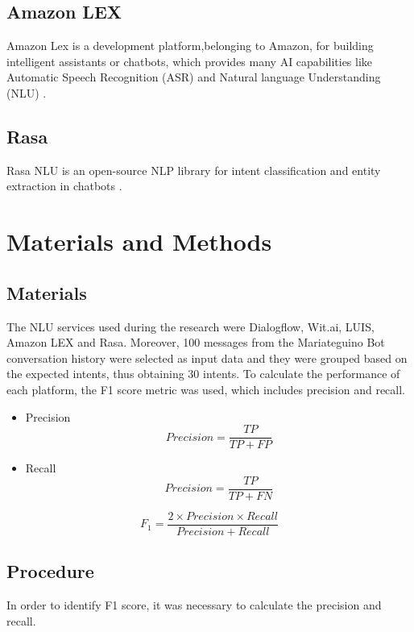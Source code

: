 \documentclass[conference]{IEEEtran}
\begin{document}
\subsection{Amazon LEX}
Amazon Lex is a development platform,belonging to Amazon, for building intelligent assistants or chatbots, which provides many AI capabilities like Automatic Speech Recognition (ASR) and Natural language Understanding (NLU) \cite{tripuraneni2019hands}.
\subsection{Rasa}
Rasa NLU is an open-source NLP library for intent classification and entity extraction in chatbots \cite{raj2018building}.

\section{Materials and Methods}
\subsection{Materials}
The NLU services used during the research were Dialogflow, Wit.ai, LUIS, Amazon LEX and Rasa. Moreover, 100 messages from the Mariateguino Bot conversation history were selected as input data and they were grouped based on the expected intents, thus obtaining 30 intents. To calculate the performance of each platform, the F1 score metric was used, which includes precision and recall.

\begin{itemize}
    \item Precision
          \begin{equation}
              Precision=\frac{TP}{TP+FP}\label{eq}
          \end{equation}
    \item Recall
          \begin{equation}
              Precision=\frac{TP}{TP+FN}\label{eq}
          \end{equation}
\end{itemize}

\begin{equation}
    F_{1} =\frac{2 \times Precision\times Recall}{Precision+Recall}\label{eq}
\end{equation}

\subsection{Procedure}
In order to identify F1 score, it was necessary to calculate the precision and recall.
\end{document}
